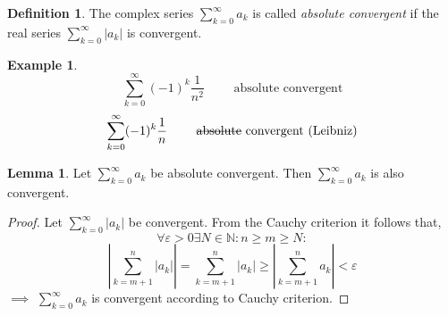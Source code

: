 \documentclass[a4paper,landscape,twocolumn]{article}
\theoremstyle{definition}
\newtheorem{defi}{Definition}
\newtheorem{ex}{Example}
\newtheorem{lemma}{Lemma}
\newcommand\abs[1]{\left|#1\right|}
\begin{document}
\begin{defi}
  The complex series $\sum_{k=0}^\infty a_k$ is called \emph{absolute convergent}
  if the real series $\sum_{k=0}^\infty \abs{a_k}$ is convergent.
\end{defi}
\begin{ex}
  \[ \sum_{k=0}^\infty (-1)^k \frac{1}{n^2} \qquad\text{ absolute convergent} \]
  \[ \sum_{k=0}^\infty (-1)^k \frac{1}{n} \qquad\text{ \sout{absolute} convergent (Leibniz)} \]
\end{ex}
%
\begin{lemma}
  Let $\sum_{k=0}^\infty a_k$ be absolute convergent.
  Then $\sum_{k=0}^\infty a_k$ is also convergent.
\end{lemma}
\begin{proof}
  Let $\sum_{k=0}^\infty \abs{a_k}$ be convergent.
  From the Cauchy criterion it follows that,
  \[ \forall \varepsilon > 0 \exists N \in \mathbb N: n \geq m \geq N: \]
  \[
    \abs{\sum_{k=m+1}^n \abs{a_k}}
    = \sum_{k=m+1}^n \abs{a_k}
    \geq \abs{\sum_{k=m+1}^n a_k}
    < \varepsilon
  \]
  $\implies$ $\sum_{k=0}^\infty a_k$ is convergent according to Cauchy criterion.
\end{proof}
%
\end{document}
